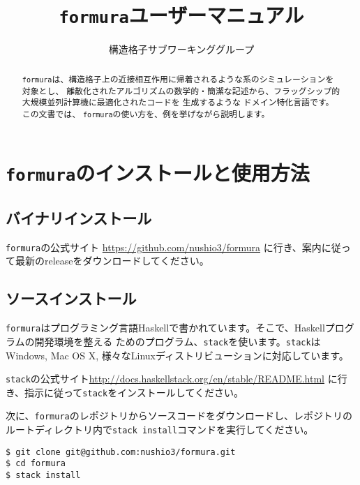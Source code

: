 \documentclass{jsarticle}
\newcommand{\formura}{{\texttt{formura}}}
\begin{document}
\title{\formura ユーザーマニュアル}

\author{構造格子サブワーキンググループ}

\maketitle


\begin{abstract}
  \formura は、構造格子上の近接相互作用に帰着されるような系のシミュレーションを対象とし、
  離散化されたアルゴリズムの数学的・簡潔な記述から、フラッグシップ的大規模並列計算機に最適化されたコードを
  生成するような
  ドメイン特化言語です。
  この文書では、
  \formura の使い方を、例を挙げながら説明します。
\end{abstract}


\newpage

\tableofcontents


\newpage
\section{\formura のインストールと使用方法}

\subsection{バイナリインストール}

\formura の公式サイト
\href{https://github.com/nushio3/formura}
{https://github.com/nushio3/formura}
に行き、案内に従って最新のreleaseをダウンロードしてください。

\subsection{ソースインストール}

\formura はプログラミング言語Haskellで書かれています。そこで、Haskellプログラムの開発環境を整える
ためのプログラム、\verb`stack`を使います。\verb`stack`はWindows, Mac OS X, 様々なLinuxディストリビューションに対応しています。

\verb`stack`の公式サイト\href{http://docs.haskellstack.org/en/stable/README.html}
    {http://docs.haskellstack.org/en/stable/README.html}
に行き、指示に従って\verb`stack`をインストールしてください。

次に、\formura のレポジトリからソースコードをダウンロードし、レポジトリのルートディレクトリ内で\verb`stack install`コマンドを実行してください。

\begin{verbatim}
$ git clone git@github.com:nushio3/formura.git
$ cd formura
$ stack install
\end{verbatim}
\end{document}
